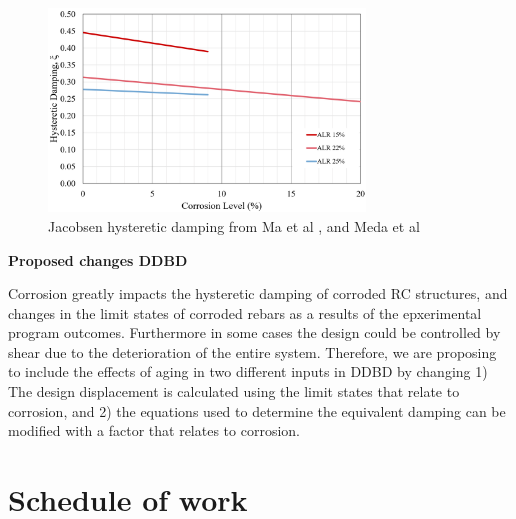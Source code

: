 \begin{figure}[htbp]
	\centering
    \includegraphics[width=0.75\textwidth]{VAC Prelim 2.0/Chapter-5/figs/HystereticDampingLitResults.png}
	\caption{Jacobsen hysteretic damping from Ma et al \cite{Ma2012}, and Meda et al \cite{Meda2014}}
	\label{fig:JacobsenResults}
\end{figure}

\textbf{Proposed changes DDBD}

Corrosion greatly impacts the hysteretic damping of corroded RC structures, and changes in the limit states of corroded rebars as a results of the epxerimental program outcomes. Furthermore in some cases the design could be controlled by shear due to the deterioration of the entire system. Therefore, we are proposing to include the effects of aging in two different inputs in DDBD by changing 1) The design displacement is calculated using the limit states that relate to corrosion, and 2) the equations used to determine the equivalent damping can be modified with a factor that relates to corrosion.

\section{Schedule of work}